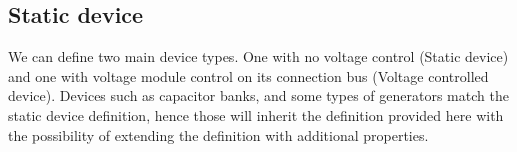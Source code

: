 \documentclass[nols,a4paper,twoside,notoc,fleqn]{tufte-book}
\begin{document}
%
%
%

%
%

\subsection{Static device}

We can define two main device types. One with no voltage control (Static device) and one with voltage module control on its connection bus (Voltage controlled device). Devices such as capacitor banks, and some types of generators match the static device definition, hence those will inherit the definition provided here with the possibility of extending the definition with additional properties.
\end{document}
